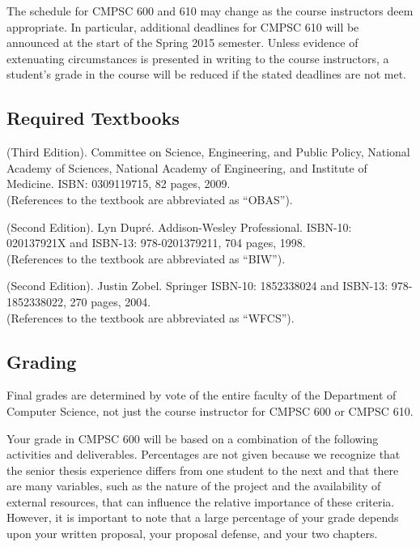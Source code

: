 \noindent The schedule for CMPSC 600 and 610 may change as the course instructors deem appropriate. In particular,
additional deadlines for CMPSC 610 will be announced at the start of the Spring 2015 semester. Unless evidence of
extenuating circumstances is presented in writing to the course instructors, a student's grade in the course will be
reduced if the stated deadlines are not met.

\vspace{-.15in}
\subsection*{Required Textbooks}

 (Third Edition).  Committee on Science,
Engineering, and Public Policy, National Academy of Sciences, National Academy of Engineering, and Institute of
Medicine. ISBN: 0309119715, 82 pages, 2009.\\ (References to the textbook are abbreviated as ``OBAS'').

 (Second Edition). Lyn Dupr\'e.  Addison-Wesley
Professional.  ISBN-10: 020137921X and ISBN-13: 978-0201379211, 704 pages, 1998.\\ (References to the textbook are
abbreviated as ``BIW'').

 (Second Edition).  Justin Zobel.  Springer ISBN-10: 1852338024 and ISBN-13:
978-1852338022, 270 pages, 2004. \\ (References to the textbook are abbreviated as ``WFCS'').

\vspace*{-.15in}
\subsection*{Grading}

Final grades are determined by vote of the entire faculty of the Department of Computer Science, not just the course instructor
for CMPSC 600 or CMPSC 610.

Your grade in CMPSC 600 will be based on a combination of the following activities and deliverables. Percentages are not
given because we recognize that the senior thesis experience differs from one student to the next and that there are many
variables, such as the nature of the project and the availability of external resources, that can influence the relative
importance of these criteria. However, it is important to note that a large percentage of your grade depends upon your
written proposal, your proposal defense, and your two chapters.  

